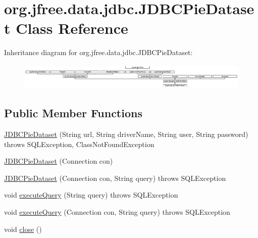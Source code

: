 \hypertarget{classorg_1_1jfree_1_1data_1_1jdbc_1_1_j_d_b_c_pie_dataset}{}\section{org.\+jfree.\+data.\+jdbc.\+J\+D\+B\+C\+Pie\+Dataset Class Reference}
\label{classorg_1_1jfree_1_1data_1_1jdbc_1_1_j_d_b_c_pie_dataset}
Inheritance diagram for org.\+jfree.\+data.\+jdbc.\+J\+D\+B\+C\+Pie\+Dataset\+:\begin{figure}[H]
\begin{center}
\leavevmode
\includegraphics[height=1.254480cm]{classorg_1_1jfree_1_1data_1_1jdbc_1_1_j_d_b_c_pie_dataset}
\end{center}
\end{figure}
\subsection*{Public Member Functions}
\begin{DoxyCompactItemize}
\item 
\mbox{\hyperlink{classorg_1_1jfree_1_1data_1_1jdbc_1_1_j_d_b_c_pie_dataset_a0723d757f5d580e1267f5fc0af370d84}{J\+D\+B\+C\+Pie\+Dataset}} (String url, String driver\+Name, String user, String password)  throws S\+Q\+L\+Exception, Class\+Not\+Found\+Exception 
\item 
\mbox{\hyperlink{classorg_1_1jfree_1_1data_1_1jdbc_1_1_j_d_b_c_pie_dataset_af5ecc1304370879c77b24799612a95a2}{J\+D\+B\+C\+Pie\+Dataset}} (Connection con)
\item 
\mbox{\hyperlink{classorg_1_1jfree_1_1data_1_1jdbc_1_1_j_d_b_c_pie_dataset_ac815266823496b40caff38735767ae7b}{J\+D\+B\+C\+Pie\+Dataset}} (Connection con, String query)  throws S\+Q\+L\+Exception 
\item 
void \mbox{\hyperlink{classorg_1_1jfree_1_1data_1_1jdbc_1_1_j_d_b_c_pie_dataset_a683c9d8a431081ae4a8b2941b1d17633}{execute\+Query}} (String query)  throws S\+Q\+L\+Exception 
\item 
void \mbox{\hyperlink{classorg_1_1jfree_1_1data_1_1jdbc_1_1_j_d_b_c_pie_dataset_adce5416eb519021f1fdd956025abf8b6}{execute\+Query}} (Connection con, String query)  throws S\+Q\+L\+Exception 
\item 
void \mbox{\hyperlink{classorg_1_1jfree_1_1data_1_1jdbc_1_1_j_d_b_c_pie_dataset_a40ab494ddaf4524fbcafafc0539fdcb5}{close}} ()
\end{DoxyCompactItemize}
